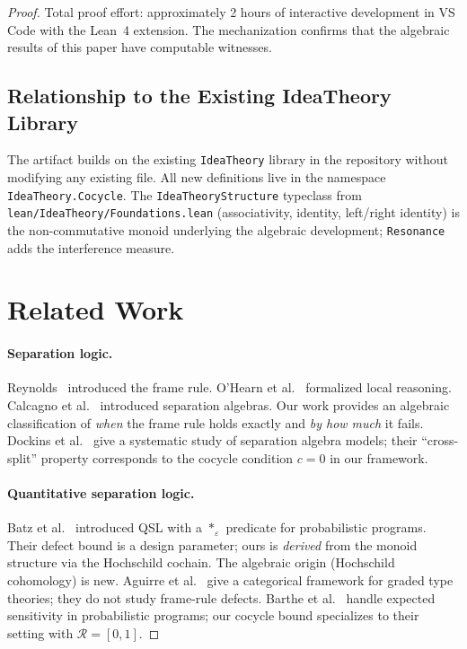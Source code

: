 \documentclass[acmsmall,sigplan,anonymous,review,screen]{acmart}
\theoremstyle{plain}
\theoremstyle{definition}
\newcommand{\lean}[1]{\texttt{#1}}
\begin{document}
\begin{proof}
Total proof effort: approximately 2 hours of interactive development
in VS Code with the Lean~4 extension.  The mechanization confirms
that the algebraic results of this paper have computable witnesses.

\subsection{Relationship to the Existing IdeaTheory Library}
\label{sec:lean:ideatheory}

The artifact builds on the existing \lean{IdeaTheory} library in the
repository without modifying any existing file.  All new definitions
live in the namespace \lean{IdeaTheory.Cocycle}.  The
\lean{IdeaTheoryStructure} typeclass from \lean{lean/IdeaTheory/Foundations.lean}
(associativity, identity, left/right identity) is the non-commutative
monoid underlying the algebraic development; \lean{Resonance} adds the
interference measure.

\section{Related Work}
\label{sec:related}

\paragraph{Separation logic.}
Reynolds~\cite{reynolds2002separation} introduced the frame rule.
O'Hearn et al.~\cite{ohearn2001local} formalized local reasoning.
Calcagno et al.~\cite{calcagno2007local} introduced separation algebras.
Our work provides an algebraic classification of \emph{when} the
frame rule holds exactly and \emph{by how much} it fails.
Dockins et al.~\cite{dockins2009separation} give a systematic study of
separation algebra models; their ``cross-split'' property corresponds
to the cocycle condition $c = 0$ in our framework.

\paragraph{Quantitative separation logic.}
Batz et al.~\cite{batz2019quantitative} introduced QSL with a
$*_\varepsilon$ predicate for probabilistic programs.  Their defect
bound is a design parameter; ours is \emph{derived} from the monoid
structure via the Hochschild cochain.  The algebraic origin (Hochschild
cohomology) is new.  Aguirre et al.~\cite{aguirre2021general} give a
categorical framework for graded type theories; they do not study
frame-rule defects.  Barthe et al.~\cite{barthe2019probabilistic} handle
expected sensitivity in probabilistic programs; our cocycle bound
specializes to their setting with $\mathcal{R} = [0,1]$.


\end{proof}
\end{document}
